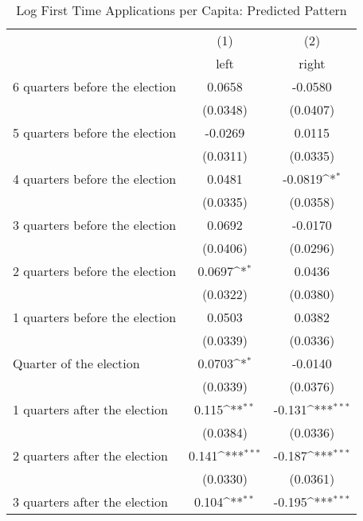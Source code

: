 \begin{table}[htbp]\centering
\def\sym#1{\ifmmode^{#1}\else\(^{#1}\)\fi}
\caption{Log First Time Applications per Capita: Predicted Pattern}
\begin{tabular}{l*{2}{c}}
\hline\hline
                    &\multicolumn{1}{c}{(1)}&\multicolumn{1}{c}{(2)}\\
                    &\multicolumn{1}{c}{left}&\multicolumn{1}{c}{right}\\
\hline
 6 quarters before the election&      0.0658         &     -0.0580         \\
                    &    (0.0348)         &    (0.0407)         \\
[1em]
 5 quarters before the election&     -0.0269         &      0.0115         \\
                    &    (0.0311)         &    (0.0335)         \\
[1em]
 4 quarters before the election&      0.0481         &     -0.0819\sym{*}  \\
                    &    (0.0335)         &    (0.0358)         \\
[1em]
 3 quarters before the election&      0.0692         &     -0.0170         \\
                    &    (0.0406)         &    (0.0296)         \\
[1em]
 2 quarters before the election&      0.0697\sym{*}  &      0.0436         \\
                    &    (0.0322)         &    (0.0380)         \\
[1em]
 1 quarters before the election&      0.0503         &      0.0382         \\
                    &    (0.0339)         &    (0.0336)         \\
[1em]
Quarter of the election&      0.0703\sym{*}  &     -0.0140         \\
                    &    (0.0339)         &    (0.0376)         \\
[1em]
 1 quarters after the election&       0.115\sym{**} &      -0.131\sym{***}\\
                    &    (0.0384)         &    (0.0336)         \\
[1em]
 2 quarters after the election&       0.141\sym{***}&      -0.187\sym{***}\\
                    &    (0.0330)         &    (0.0361)         \\
[1em]
 3 quarters after the election&       0.104\sym{**} &      -0.195\sym{***}\\

\end{tabular}
\end{table}
